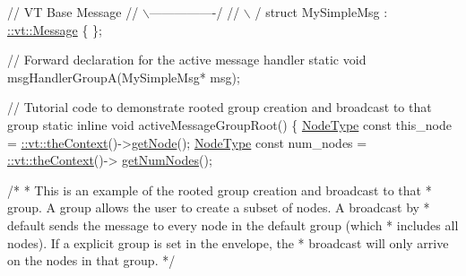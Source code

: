 \begin{DoxyCodeInclude}
\textcolor{comment}{//                  VT Base Message}
\textcolor{comment}{//                 \(\backslash\)----------------/}
\textcolor{comment}{//                  \(\backslash\)              /}
\textcolor{keyword}{struct }MySimpleMsg : \hyperlink{structvt_1_1messaging_1_1_active_msg}{::vt::Message} \{ \};

\textcolor{comment}{// Forward declaration for the active message handler}
\textcolor{keyword}{static} \textcolor{keywordtype}{void} msgHandlerGroupA(MySimpleMsg* msg);

\textcolor{comment}{// Tutorial code to demonstrate rooted group creation and broadcast to that group}
\textcolor{keyword}{static} \textcolor{keyword}{inline} \textcolor{keywordtype}{void} activeMessageGroupRoot() \{
  \hyperlink{namespacevt_a866da9d0efc19c0a1ce79e9e492f47e2}{NodeType} \textcolor{keyword}{const} this\_node = \hyperlink{namespacevt_a26551fe0e6e6a1371111df5b12c7e92c}{::vt::theContext}()->\hyperlink{structvt_1_1ctx_1_1_context_a0d52c263ce8516546a67443d9a86fa5f}{getNode}();
  \hyperlink{namespacevt_a866da9d0efc19c0a1ce79e9e492f47e2}{NodeType} \textcolor{keyword}{const} num\_nodes = \hyperlink{namespacevt_a26551fe0e6e6a1371111df5b12c7e92c}{::vt::theContext}()->
      \hyperlink{structvt_1_1ctx_1_1_context_a7f41071aadf6d5fa9e1b6c703c5ff19d}{getNumNodes}();

  \textcolor{comment}{/*}
\textcolor{comment}{   * This is an example of the rooted group creation and broadcast to that}
\textcolor{comment}{   * group. A group allows the user to create a subset of nodes. A broadcast by}
\textcolor{comment}{   * default sends the message to every node in the default group (which}
\textcolor{comment}{   * includes all nodes). If a explicit group is set in the envelope, the}
\textcolor{comment}{   * broadcast will only arrive on the nodes in that group.}
\textcolor{comment}{   */}


\end{DoxyCodeInclude}
